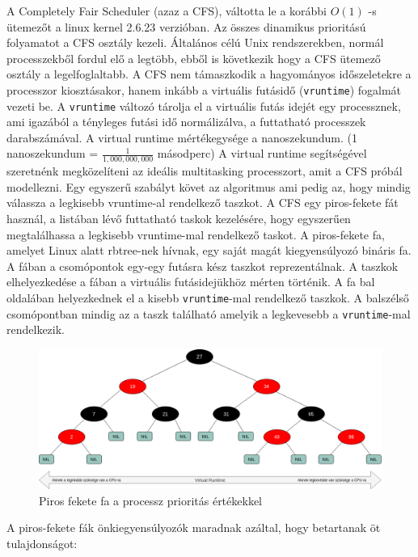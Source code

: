 

A Completely Fair Scheduler (azaz a CFS), váltotta le a korábbi $O(1)$ -s ütemezőt a linux kernel 2.6.23 verzióban.
Az összes dinamikus prioritású folyamatot a CFS osztály kezeli. Általános célú Unix rendszerekben, normál processzekből fordul elő a legtöbb, ebből is következik hogy a CFS ütemező osztály a legelfoglaltabb.
A CFS nem támaszkodik a hagyományos időszeletekre a processzor kiosztásakor, hanem inkább a virtuális futásidő (\texttt{vruntime}) fogalmát vezeti be.
A \texttt{vruntime} változó tárolja el a virtuális futás idejét egy processznek, ami igazából a tényleges futási idő normálizálva, a futtatható processzek darabszámával.
A virtual runtime mértékegysége a nanoszekundum. (1 nanoszekundum = $\frac{1}{1,000,000,000}$ másodperc)
A virtual runtime segítségével szeretnénk megközelíteni az ideális multitasking processzort, amit a CFS próbál modellezni. Egy egyszerű szabályt követ az algoritmus ami pedig az, hogy mindig válassza a legkisebb vruntime-al rendelkező taszkot. A CFS egy piros-fekete fát használ, a listában lévő futtatható taskok kezelésére, hogy egyszerűen megtalálhassa a legkisebb vruntime-mal rendelkező taskot.
A piros-fekete fa, amelyet Linux alatt rbtree-nek hívnak, egy saját magát kiegyensúlyozó bináris fa.
A fában a csomópontok egy-egy futásra kész taszkot reprezentálnak. A taszkok elhelyezkedése a fában a virtuális futásidejükhöz mérten történik. 
A fa bal oldalában helyezkednek el a kisebb \texttt{vruntime}-mal rendelkező taszkok.
A balszélső csomópontban mindig az a taszk található amelyik a legkevesebb a \texttt{vruntime}-mal rendelkezik.
\begin{figure}[h]
\centering
\includegraphics[width=\textwidth]{images/redBlackTree.png}
\caption{Piros fekete fa a processz prioritás értékekkel}
\label{fig:rb_tree}
\end{figure}

\noindent A piros-fekete fák önkiegyensúlyozók maradnak azáltal, hogy betartanak öt tulajdonságot:

